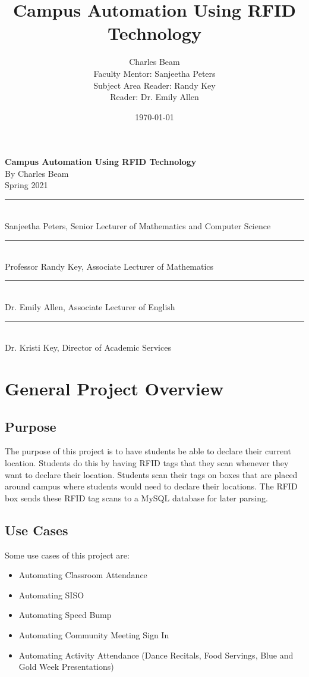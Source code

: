 \documentclass[12pt]{article}
\title{Campus Automation Using RFID Technology}
\author{Charles Beam \\ Faculty Mentor: Sanjeetha Peters \\ Subject Area Reader: Randy Key \\ Reader: Dr. Emily Allen}
\date{\today}
\begin{document}
\setlength{\parindent}{0pt}
\begin{spacing}{1.2}
\setcounter{section}{-1}
\begin{centering}
\huge
\textbf{Campus Automation Using RFID Technology}
\\[0.4in]
\Large
By Charles Beam
\\[0.4in]
\normalsize
Spring 2021
\\[0.8in]
\rule{3in}{0.4pt} \\
Sanjeetha Peters, Senior Lecturer of Mathematics and Computer Science
\\[0.8in]
\rule{3in}{0.4pt} \\
Professor Randy Key, Associate Lecturer of Mathematics
\\[0.8in]
\rule{3in}{0.4pt} \\
Dr. Emily Allen, Associate Lecturer of English
\\[0.8in]
\rule{3in}{0.4pt} \\
Dr. Kristi Key, Director of Academic Services \\
\end{centering}
\newpage
\tableofcontents
\newpage

\section{General Project Overview}

\subsection{Purpose}

The purpose of this project is to have students be able to declare their current location. Students do this by having RFID tags that they scan whenever they want to declare their location. Students scan their tags on boxes that are placed around campus where students would need to declare their locations. The RFID box sends these RFID tag scans to a MySQL database for later parsing.

\subsection{Use Cases}

Some use cases of this project are:
\begin{itemize}
	\item Automating Classroom Attendance
	\item Automating SISO
	\item Automating Speed Bump
	\item Automating Community Meeting Sign In
	\item Automating Activity Attendance (Dance Recitals, Food Servings, Blue and Gold Week Presentations)
\end{itemize}


\end{spacing}
\end{document}
